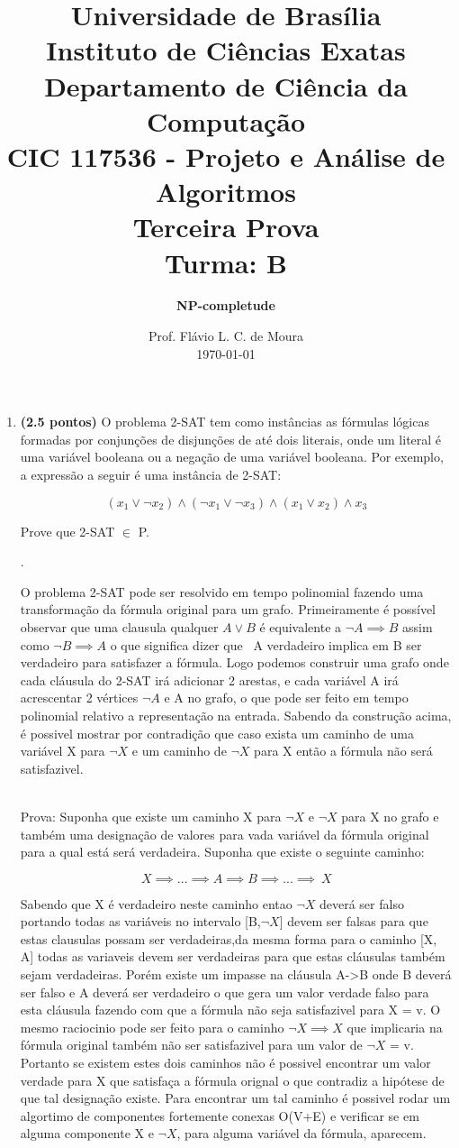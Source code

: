 \documentclass[12pt]{article}
\title{{\large Universidade de Brasília \\ Instituto de Ciências Exatas \\
Departamento de Ciência da Computação} \\[1cm]
CIC 117536 - Projeto e Análise de Algoritmos \\[.5cm]  Terceira Prova \\[.5cm] Turma: B}
\author{{\bf NP-completude}}
\date{Prof. Flávio L. C. de Moura \\[.5cm] \today}
\newcommand{\resposta}[1]{ \noindent {\bf Solução}.{\color{blue} #1}}
\begin{document}
\maketitle

\begin{enumerate}
\item {\bf (2.5 pontos)} O problema 2-SAT tem como instâncias as
  fórmulas lógicas formadas por conjunções de disjunções de até dois
  literais, onde um literal é uma variável booleana ou a negação de
  uma variável booleana. Por exemplo, a expressão a seguir é uma
  instância de 2-SAT:

  $$(x_1\lor \neg x_2)\land (\neg x_1 \lor \neg x_3) \land (x_1 \lor x_2) \land x_3$$

  Prove que 2-SAT $\in$ P.

 
  \resposta{
    O problema 2-SAT pode ser resolvido em tempo polinomial fazendo uma transformação da fórmula original para um grafo. Primeiramente é possível observar que uma clausula
    qualquer \(A \lor B\) é equivalente a \(\neg A \implies B\) assim como \(\neg B \implies A\) o que significa dizer que ~A verdadeiro implica em B ser verdadeiro para satisfazer a fórmula. Logo podemos
    construir uma grafo onde cada cláusula do 2-SAT irá adicionar 2 arestas, e cada variável A irá acrescentar 2 vértices \(\neg A\) e A no grafo, o que pode ser feito em tempo polinomial relativo a representação na entrada. Sabendo da construção acima, é possivel mostrar por contradição que caso exista um caminho de uma variável X para \(\neg X\) e um caminho de \(\neg X\) para X então a fórmula não será satisfazivel.

\\ Prova:
	Suponha que existe um caminho X para \(\neg X\) e \(\neg X\) para X no grafo e também uma designação de valores para vada variável da fórmula original para a qual está será verdadeira. Suponha que existe o seguinte caminho:
			
\[X \implies ... \implies A \implies B \implies ... \implies ~X\]
		
    Sabendo que X é verdadeiro neste caminho entao \(\neg X\) deverá ser falso portando todas as variáveis no intervalo [B,\(\neg X\)] devem ser falsas para que estas clausulas possam ser verdadeiras,da mesma forma para o caminho [X, A] todas as variaveis devem ser verdadeiras para que estas cláusulas também sejam verdadeiras. Porém existe um impasse na cláusula A->B onde B deverá ser falso e A deverá ser verdadeiro o que gera um valor verdade falso para esta cláusula fazendo com que a fórmula não seja satisfazivel para X = v. O mesmo raciocinio pode ser feito para o caminho \(\neg X \implies X\) que implicaria na fórmula original também não ser satisfazivel para um valor de \(\neg X\) = v. Portanto se existem estes dois caminhos não é possivel encontrar um valor verdade para X que satisfaça a fórmula orignal o que contradiz a hipótese de que tal designação existe. Para encontrar um tal caminho é possivel rodar um algortimo de componentes fortemente conexas O(V+E) e verificar se em alguma componente X e \(\neg X\), para alguma variável da fórmula, aparecem.
    
}
\end{enumerate}
\end{document}
